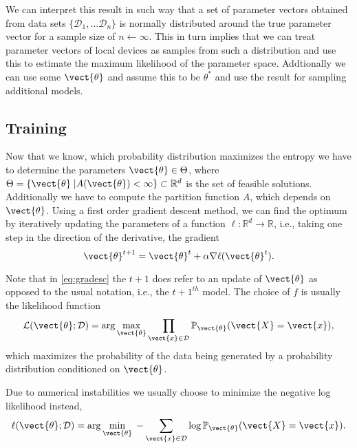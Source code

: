         We can interpret this result in such way that a set of parameter vectors obtained from data sets $\{\mathcal{D}_1, \ldots \mathcal{D}_n\}$ is normally distributed around the true parameter vector for a sample size of $n \leftarrow \infty$. 
        This in turn implies that we can treat parameter vectors of local devices as samples from such a distribution and use this to estimate the maximum likelihood of the parameter space.
        Addtionally we can use some $\vect{\theta}$ and assume this to be $\theta^*$ and use the result for sampling additional models.
        
    \subsection{Training}
    \label{ssec:train}

    Now that we know, which probability distribution maximizes the entropy we have to determine the parameters $\vect{\theta} \in \Theta$, where $\Theta = \{\vect{\theta} \;\lvert A(\vect{\theta}) < \infty\} \subset \mathbb{R}^d$ is the set of feasible solutions.
    Additionally we have to compute the partition function $A$, which depends on $\vect{\theta}$.
    Using a first order gradient descent method, we can find the optimum by iteratively updating the parameters of a function $\ell: \mathbb{R}^d \rightarrow \mathbb{R}$, i.e., taking one step in the direction of the derivative, the gradient 
    \begin{equation}
        \label{eq:gradesc}
        \vect{\theta}^{t+1} = \vect{\theta}^{t} + \alpha \nabla \ell(\vect{\theta}^{t}).
    \end{equation}

    Note that in \eq\ref{eq:gradesc} the $t+1$ does refer to an update of $\vect{\theta}$ as opposed to the usual notation, i.e., the $t+1^{th}$ model. 
    The choice of $f$ is usually the likelihood function
    \begin{equation}
        \label{eq:likelihood}
        \mathcal{L}(\vect{\theta} ; \mathcal{D}) = \arg\max_{\vect{\theta}}\prod_{\vect{x} \in \mathcal{D}}  \mathbb{P}_{\vect{\theta}}(\vect{X} = \vect{x}),
    \end{equation}
    which maximizes the probability of the data being generated by a probability distribution conditioned on $\vect{\theta}$.

    Due to numerical instabilities we usually choose to minimize the negative log likelihood instead,
    \begin{equation}
        \label{eq:likelihood:log}
        \ell(\vect{\theta} ; \mathcal{D}) = \arg\min_{\vect{\theta}} \; - \sum_{\vect{x} \in \mathcal{D}}  \log \mathbb{P}_{\vect{\theta}}(\vect{X} = \vect{x}).
    \end{equation}

